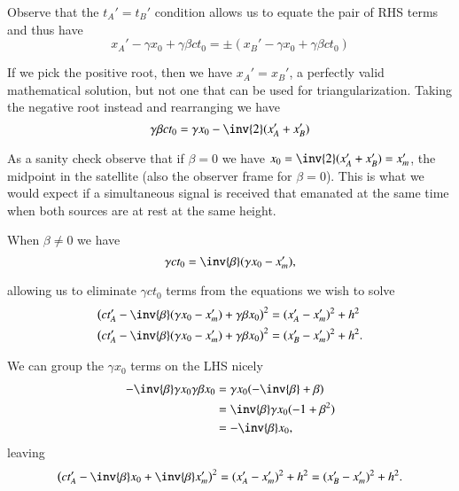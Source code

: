 {Observe that the \(t_A' = t_B'\) condition allows us to equate the pair of RHS terms and thus have
%
\begin{equation}\label{eqn:relElectroDynProblemSet1:1280}
x_A' - \gamma x_0 + \gamma \beta c t_0 = \pm (x_B' - \gamma x_0 + \gamma \beta c t_0 )
\end{equation}

If we pick the positive root, then we have \(x_A' = x_B'\), a perfectly valid mathematical solution, but not one that can be used for triangularization.  Taking the negative root instead and rearranging we have
%
\begin{equation}\label{eqn:relElectroDynProblemSet1:1301}
\gamma \beta c t_0 = \gamma x_0 - \inv{2}(x_A' + x_B')
\end{equation}

As a sanity check observe that if \(\beta = 0\) we have \(x_0 = \inv{2}(x_A' + x_B') = x_m'\), the midpoint in the satellite (also the observer frame for \(\beta = 0\)).  This is what we would expect if a simultaneous signal is received that emanated at the same time when both sources are at rest at the same height.

When \(\beta \ne 0\) we have
%
\begin{equation}\label{eqn:relElectroDynProblemSet1:1302}
\gamma c t_0 = \inv{\beta}(\gamma x_0 - x_m'),
\end{equation}

allowing us to eliminate \(\gamma c t_0\) terms from the equations we wish to solve
%
\begin{equation}\label{eqn:relElectroDynProblemSet1:1262}
\begin{aligned}
\left( c t_A' - \inv{\beta}( \gamma x_0 - x_m') + \gamma \beta x_0 \right)^2 &= (x_A' - x_m')^2 + h^2 \\
\left( c t_A' - \inv{\beta}( \gamma x_0 - x_m') + \gamma \beta x_0 \right)^2 &= (x_B' - x_m')^2 + h^2.
\end{aligned}
\end{equation}

We can group the \(\gamma x_0\) terms on the LHS nicely
%
\begin{equation}\label{eqn:relElectroDynProblemSet1:1540}
\begin{aligned}
- \inv{\beta} \gamma x_0 \gamma \beta x_0
&=
\gamma x_0 ( - \inv{\beta} + \beta ) \\
&=
\inv{\beta} \gamma x_0 ( - 1 + \beta^2 ) \\
&=
-\inv{\beta} x_0,
\end{aligned}
\end{equation}
leaving
\begin{equation}\label{eqn:relElectroDynProblemSet1:1400}
\left( c t_A' -\inv{\beta} x_0 + \inv{\beta} x_m' \right)^2 = (x_A' - x_m')^2 + h^2 = (x_B' - x_m')^2 + h^2.
\end{equation}

}
